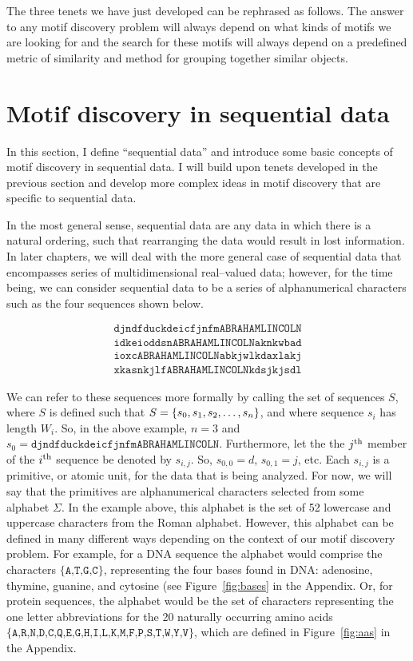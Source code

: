 The three tenets we have just developed can be rephrased as follows.
The answer to any motif discovery problem will always depend on what
kinds of motifs we are looking for and the search for these motifs
will always depend on a predefined metric of similarity and method
for grouping together similar objects.

\section{Motif discovery in sequential data}


In this section, I define ``sequential data'' and introduce some
basic concepts of motif discovery in sequential data.  I will build
upon tenets developed in the previous section and develop more
complex ideas in motif discovery that are specific to sequential
data.

In the most general sense, sequential data are any data in which
there is a natural ordering, such that rearranging the data would
result in lost information.  In later chapters, we will deal with
the more general case of sequential data that encompasses series of
multidimensional real--valued data; however, for the time being, we
can consider sequential data to be a series of alphanumerical
characters such as the four sequences shown below.

\begin{multline}\label{eqn:lincoln1}
   \texttt{djndfduckdeicfjnfmABRAHAMLINCOLN}\\
   \texttt{idkeioddsnABRAHAMLINCOLNaknkwbad}\\
   \texttt{ioxcABRAHAMLINCOLNabkjwlkdaxlakj}\\
   \texttt{xkasnkjlfABRAHAMLINCOLNkdsjkjsdl}
\end{multline}



    We can refer to these sequences more formally by calling the set
    of sequences $S$, where $S$ is defined such that
     $S=\left\{s_0,s_1,s_2,\ldots,s_n\right\}$, and where
    sequence $s_i$ has length $W_i$.  So, in the above example, $n=3$
    and $s_0=\texttt{djndfduckdeicfjnfmABRAHAMLINCOLN}$.  Furthermore, let
    the
    the ${j^{\textrm{th}}}$ member of the ${i^{\textrm{th}}}$ sequence
    be denoted by $s_{i,j}$.
    So, $s_{0,0}=d$, $s_{0,1}=j$, etc.
    Each $s_{i,j}$ is a
    primitive, or atomic unit, for the data that is
    being analyzed.  For now, we will say that the primitives
    are alphanumerical characters selected from some alphabet
    $\Sigma$.  In the example above, this alphabet is the set of 52
    lowercase and uppercase characters from the Roman alphabet.
    However, this alphabet can be defined in many different ways
    depending on the context of our motif discovery problem.  For
    example, for a DNA sequence the alphabet would
    comprise the characters $\{\texttt{A,T,G,C}\}$, representing the
    four bases found in DNA: adenosine, thymine, guanine, and
    cytosine (see Figure~\vref{fig:bases} in the Appendix.  Or, for protein sequences,
    the alphabet would be the
    set of characters representing the one letter abbreviations for
    the 20 naturally occurring amino acids
    $\{\texttt{A,R,N,D,C,Q,E,G,H,I,L,K,M,F,P,S,T,W,Y,V}\}$, which
    are defined in Figure~\vref{fig:aas} in the Appendix.


